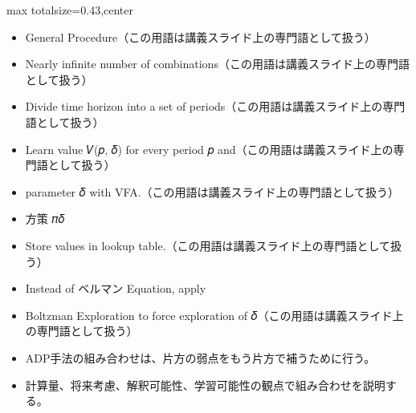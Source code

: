 \clearpage
{}
\begin{minipage}[t]{0.405\textwidth}
\begin{adjustbox}{max totalsize={\textwidth}{0.43\textheight},center}
\begin{minipage}{\textwidth}\scriptsize
{}\begin{itemize}
\item General Procedure（この用語は講義スライド上の専門語として扱う）
\item Nearly infinite number of combinations（この用語は講義スライド上の専門語として扱う）
\item Divide time horizon into a set of periods（この用語は講義スライド上の専門語として扱う）
\item Learn value 𝑉(𝑝, 𝛿) for every period 𝑝 and（この用語は講義スライド上の専門語として扱う）
\item parameter 𝛿 with VFA.（この用語は講義スライド上の専門語として扱う）
\item 方策 𝜋𝛿
\item Store values in lookup table.（この用語は講義スライド上の専門語として扱う）
\item Instead of ベルマン Equation, apply
\item Boltzman Exploration to force exploration of 𝛿（この用語は講義スライド上の専門語として扱う）
\end{itemize}\begin{itemize}
\item ADP手法の組み合わせは、片方の弱点をもう片方で補うために行う。
\item 計算量、将来考慮、解釈可能性、学習可能性の観点で組み合わせを説明する。
\end{itemize}
\end{minipage}
\end{adjustbox}
\end{minipage}\hfill
